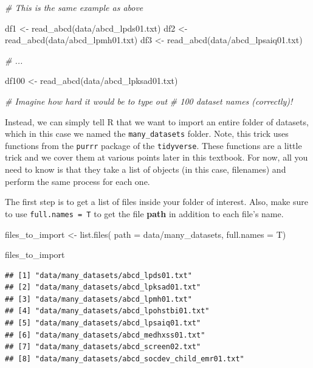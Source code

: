 \documentclass[
]{book}
\newenvironment{Shaded}{\begin{snugshade}}{\end{snugshade}}
\newcommand{\AttributeTok}[1]{\textcolor[rgb]{0.77,0.63,0.00}{#1}}
\newcommand{\CommentTok}[1]{\textcolor[rgb]{0.56,0.35,0.01}{\textit{#1}}}
\newcommand{\FunctionTok}[1]{\textcolor[rgb]{0.00,0.00,0.00}{#1}}
\newcommand{\NormalTok}[1]{#1}
\newcommand{\OtherTok}[1]{\textcolor[rgb]{0.56,0.35,0.01}{#1}}
\newcommand{\StringTok}[1]{\textcolor[rgb]{0.31,0.60,0.02}{#1}}
\begin{document}
\begin{Shaded}
\begin{Highlighting}[]
\CommentTok{\# This is the same example as above}

\NormalTok{df1 }\OtherTok{\textless{}{-}} \FunctionTok{read\_abcd}\NormalTok{(}\StringTok{\textquotesingle{}data/abcd\_lpds01.txt\textquotesingle{}}\NormalTok{)}
\NormalTok{df2 }\OtherTok{\textless{}{-}} \FunctionTok{read\_abcd}\NormalTok{(}\StringTok{\textquotesingle{}data/abcd\_lpmh01.txt\textquotesingle{}}\NormalTok{)}
\NormalTok{df3 }\OtherTok{\textless{}{-}} \FunctionTok{read\_abcd}\NormalTok{(}\StringTok{\textquotesingle{}data/abcd\_lpsaiq01.txt\textquotesingle{}}\NormalTok{)}

\CommentTok{\# ... }

\NormalTok{df100 }\OtherTok{\textless{}{-}} \FunctionTok{read\_abcd}\NormalTok{(}\StringTok{\textquotesingle{}data/abcd\_lpksad01.txt\textquotesingle{}}\NormalTok{)}

\CommentTok{\# Imagine how hard it would be to type out }
\CommentTok{\# 100 dataset names (correctly)!}
\end{Highlighting}
\end{Shaded}

Instead, we can simply tell R that we want to import an entire folder of datasets, which in this case we named the \texttt{many\_datasets} folder. Note, this trick uses functions from the \texttt{purrr} package of the \texttt{tidyverse}. These functions are a little trick and we cover them at various points later in this textbook. For now, all you need to know is that they take a list of objects (in this case, filenames) and perform the same process for each one.

The first step is to get a list of files inside your folder of interest. Also, make sure to use \texttt{full.names\ =\ T} to get the file \textbf{path} in addition to each file's name.

\begin{Shaded}
\begin{Highlighting}[]
\NormalTok{files\_to\_import }\OtherTok{\textless{}{-}} \FunctionTok{list.files}\NormalTok{(}
  \AttributeTok{path =} \StringTok{\textquotesingle{}data/many\_datasets\textquotesingle{}}\NormalTok{, }
  \AttributeTok{full.names =}\NormalTok{ T)}

\NormalTok{files\_to\_import}
\end{Highlighting}
\end{Shaded}

\begin{verbatim}
## [1] "data/many_datasets/abcd_lpds01.txt"            
## [2] "data/many_datasets/abcd_lpksad01.txt"          
## [3] "data/many_datasets/abcd_lpmh01.txt"            
## [4] "data/many_datasets/abcd_lpohstbi01.txt"        
## [5] "data/many_datasets/abcd_lpsaiq01.txt"          
## [6] "data/many_datasets/abcd_medhxss01.txt"         
## [7] "data/many_datasets/abcd_screen02.txt"          
## [8] "data/many_datasets/abcd_socdev_child_emr01.txt"
\end{verbatim}
\end{document}
